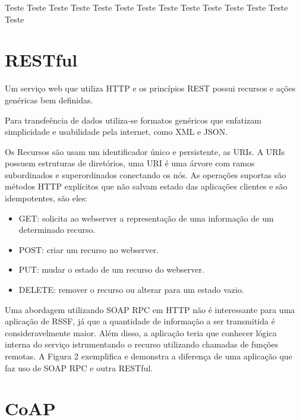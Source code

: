 Teste Teste 
Teste Teste 
Teste Teste 
Teste Teste 
Teste Teste 
Teste Teste 
Teste Teste 

\cite{perrey2003service}



\section{RESTful}

Um servi\c{c}o web que utiliza HTTP e os princ\'ipios REST possui recursos e a\c{c}\~oes gen\'ericas bem definidas.\cite{rest}

Para transfe\^encia de dados utiliza-se formatos gen\'ericos que enfatizam simplicidade e usabilidade pela internet, como XML e JSON.

Os Recursos s\~ao usam um identificador \'unico e persistente, as URIs. A URIs possuem estruturas de diret\'orios, uma URI \'e uma \'arvore com ramos subordinados e superordinados conectando os n\'os. As opera\c{c}\~oes suportas s\~ao m\'etodos HTTP expl\'icitos que n\~ao salvam estado das aplica\c{c}\~oes clientes e s\~ao idempotentes, s\~ao eles:
\begin{itemize}
    \item GET: solicita ao webserver a representa\c{c}\~ao de uma informa\c{c}\~ao de um determinado recurso.
    \item POST: criar um recurso no webserver.
    \item PUT: mudar o estado de um recurso do webserver.
    \item DELETE: remover o recurso ou alterar para um estado vazio.
\end{itemize}

Uma abordagem utilizando SOAP RPC em HTTP n\~ao \'e interessante para uma aplica\c{c}\~ao de RSSF, j\'a que a quantidade de informa\c{c}\~ao a ser transmitida \'e consideravelmente maior. Al\'em disso, a aplica\c{c}\~ao teria que conhecer l\'ogica interna do servi\c{c}o istrumentando o recurso utilizando chamadas de fun\c{c}\~oes remotas. A Figura 2 exemplifica e demonstra a diferen\c{c}a de uma aplica\c{c}\~ao que faz uso de SOAP RPC e outra RESTful.\cite{richardson2008restful}


\section{CoAP}

